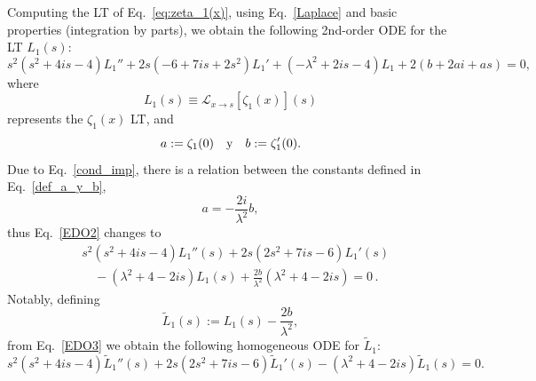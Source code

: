 \documentclass[
 aip,
 jmp,
 amsmath,amssymb,
 reprint,
 nofootinbib,
]{revtex4-2}
\begin{document}
Computing the LT of Eq.~\eqref{eq:zeta_1(x)}, using Eq.~\eqref{Laplace} and basic properties (integration by parts), we obtain the following 2nd-order ODE for the LT $L_1(s)$:
\begin{equation}\label{EDO2}
s^2 \left(s^2+4is -4\right)L_1'' + 2s \left(-6+7is+2s^2\right)L_1' + \left(-\lambda^2+2is-4\right)L_1+2\left(b+2ai+as\right) = 0 ,
\end{equation}
where 
\begin{equation}
L_1(s)\equiv\mathcal{L}_{x\to s}\left[\zeta_1(x)\right](s)
\end{equation}
represents the $\zeta_1(x)$ LT, and
\begin{equation}\label{def_a_y_b}
    a:=\zeta_1(0)\quad \textnormal{y}\quad b:=\zeta_1'(0).
\end{equation}
Due to Eq.~\eqref{cond_imp}, there is a relation between the constants defined in Eq.~\eqref{def_a_y_b},
\begin{equation*}
    a= -\frac{2i}{\lambda^2} b,
\end{equation*}
thus Eq.~\eqref{EDO2} changes to
\begin{equation}\label{EDO3}
\begin{aligned}
& s^2 \left(s^2+4is -4\right)L_1''(s) + 2s \left(2s^2+7is-6\right)L_1'(s) \\
& \quad - \left(\lambda^2+4 -2is\right)L_1(s)+ \frac{2b}{\lambda^2} \left( \lambda^2 +4  -2i s\right)=0\,.
\end{aligned}
\end{equation}
Notably, defining
\begin{equation}
\widetilde L_1(s):=   L_1(s) -  \frac{2b}{\lambda^2},
\end{equation}
from Eq.~\eqref{EDO3} we obtain the following homogeneous ODE for $\widetilde L_1$:
\begin{equation}\label{EDO4}
    s^2 \left(s^2+4is -4\right) \widetilde L_1''(s) + 2s \left(2s^2+7is-6\right) \widetilde L_1'(s) - \left(\lambda^2+4 -2is\right)\widetilde L_1(s)=0.
\end{equation}
\end{document}
